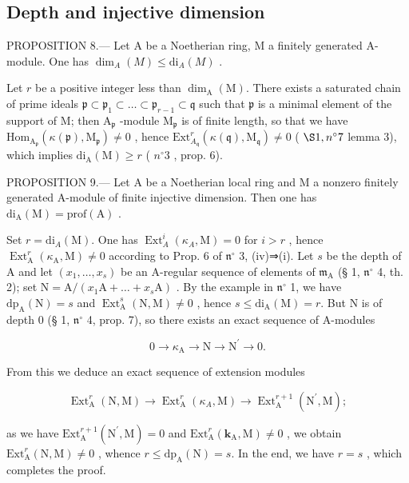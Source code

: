\subsection{Depth and injective dimension}

PROPOSITION 8.--- Let A be a Noetherian ring, M a finitely generated A-module. One has \(\dim_{A}(M) \leqslant \mathrm{di}_{A}(M)\) .

Let \(r\) be a positive integer less than \(\dim_{\mathrm{A}}(\mathrm{M})\). There exists a saturated chain of prime ideals \(\mathfrak{p} \subset \mathfrak{p}_{1} \subset \ldots \subset \mathfrak{p}_{r-1} \subset \mathfrak{q}\) such that \(\mathfrak{p}\) is a minimal element of the support of M; then \(\mathrm{A}_{\mathfrak{p}}\) -module \(\mathrm{M}_{\mathfrak{p}}\) is of finite length, so that we have \(\mathrm{Hom}_{\mathrm{A}_{\mathfrak{p}}}(\kappa(\mathfrak{p}), \mathrm{M}_{\mathfrak{p}}) \neq 0\) , hence \(\mathrm{Ext}_{A_{\mathfrak{q}}}^{r}(\kappa(\mathfrak{q}), \mathrm{M}_{\mathfrak{q}}) \neq 0\) ( \(\S 1, n^{\circ} 7\) lemma 3), which implies \(\mathrm{di}_{\mathrm{A}}(\mathrm{M}) \geqslant r\) ( \(n^{\circ} 3\) , prop. 6).

PROPOSITION 9.--- Let A be a Noetherian local ring and M a nonzero finitely generated A-module of finite injective dimension. Then one has \(\mathrm{di}_{\mathrm{A}}(\mathrm{M}) = \mathrm{prof}(\mathrm{A})\) .

Set \(r = \mathrm{di}_{A}(\mathrm{M})\). One has \(\operatorname{Ext}_{A}^{i}(\kappa_{A}, \mathrm{M}) = 0\) for \(i > r\) , hence \(\operatorname{Ext}_{\mathrm{A}}^{r}(\kappa_{\mathrm{A}}, \mathrm{M}) \neq 0\) according to Prop. 6 of \(\mathfrak{n}^{\circ}\) 3, (iv)⇒(i). Let \(s\) be the depth of A and let \((x_1, \ldots, x_s)\) be an A-regular sequence of elements of \(\mathfrak{m}_{\mathrm{A}}\) (§ 1, \(\mathfrak{n}^{\circ}\) 4, th. 2); set \(\mathrm{N} = \mathrm{A}/(x_1\mathrm{A} + \ldots + x_s\mathrm{A})\) . By the example in \(\mathfrak{n}^{\circ}\) 1, we have \(\mathrm{dp}_{\mathrm{A}}(\mathrm{N}) = s\) and \(\operatorname{Ext}_{\mathrm{A}}^{s}(\mathrm{N}, \mathrm{M}) \neq 0\) , hence \(s \leqslant \mathrm{di}_{\mathrm{A}}(\mathrm{M}) = r\). But N is of depth 0 (§ 1, \(\mathfrak{n}^{\circ}\) 4, prop. 7), so there exists an exact sequence of A-modules

\[
0 \rightarrow \kappa_ {\mathrm{A}} \longrightarrow \mathrm{N} \longrightarrow \mathrm{N} ^ {\prime} \rightarrow 0.
\]

From this we deduce an exact sequence of extension modules

\[
\operatorname{Ext} _ {\mathrm{A}} ^ {r} (\mathrm{N}, \mathrm{M}) \longrightarrow \operatorname{Ext} _ {\mathrm{A}} ^ {r} (\kappa_ {A}, \mathrm{M}) \longrightarrow \operatorname{Ext} _ {\mathrm{A}} ^ {r + 1} (\mathrm{N} ^ {\prime}, \mathrm{M});
\]

as we have \(\mathrm{Ext}_{\mathrm{A}}^{r + 1}(\mathrm{N}^{\prime},\mathrm{M}) = 0\) and \(\mathrm{Ext}_{\mathrm{A}}^{r}(\mathbf{k}_{\mathrm{A}},\mathrm{M})\neq 0\) , we obtain \(\mathrm{Ext}_{\mathrm{A}}^{r}(\mathrm{N},\mathrm{M})\neq 0\) , whence \(r\leqslant \mathrm{dp}_{\mathrm{A}}(\mathrm{N}) = s\). In the end, we have \(r = s\) , which completes the proof.
